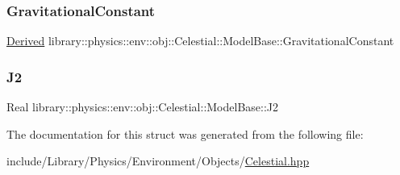 \subsubsection{\texorpdfstring{Gravitational\+Constant}{GravitationalConstant}}
{\footnotesize\ttfamily \hyperlink{classlibrary_1_1physics_1_1units_1_1_derived}{Derived} library\+::physics\+::env\+::obj\+::\+Celestial\+::\+Model\+Base\+::\+Gravitational\+Constant\hspace{0.3cm}{\ttfamily [static]}}

\mbox{\label{structlibrary_1_1physics_1_1env_1_1obj_1_1_celestial_1_1_model_base_a9016f0c506cfd899a9854c052419c653}} 
\subsubsection{\texorpdfstring{J2}{J2}}
{\footnotesize\ttfamily Real library\+::physics\+::env\+::obj\+::\+Celestial\+::\+Model\+Base\+::\+J2\hspace{0.3cm}{\ttfamily [static]}}



The documentation for this struct was generated from the following file\+:\begin{DoxyCompactItemize}
\item 
include/\+Library/\+Physics/\+Environment/\+Objects/\hyperlink{_celestial_8hpp}{Celestial.\+hpp}\end{DoxyCompactItemize}
